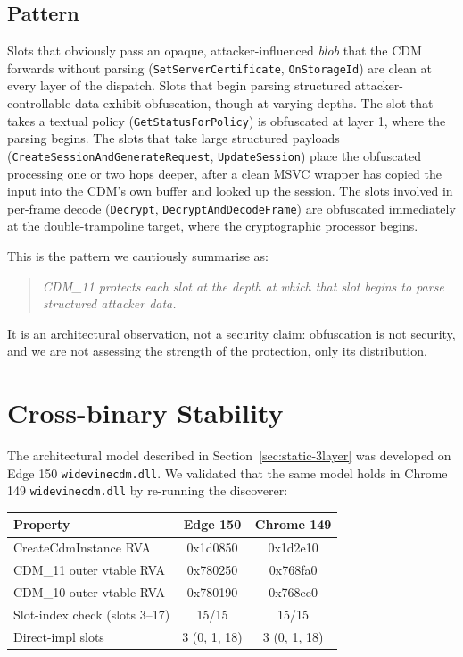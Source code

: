 \documentclass[11pt,letterpaper]{article}
\begin{document}
\subsection{Pattern}

Slots that obviously pass an opaque, attacker-influenced \emph{blob}
that the CDM forwards without parsing
(\texttt{SetServerCertificate}, \texttt{OnStorageId}) are clean at
every layer of the dispatch.  Slots that begin parsing structured
attacker-controllable data exhibit obfuscation, though at varying
depths.  The slot that takes a textual policy
(\texttt{GetStatusForPolicy}) is obfuscated at layer 1, where the
parsing begins.  The slots that take large structured payloads
(\texttt{CreateSessionAndGenerateRequest},
\texttt{UpdateSession}) place the obfuscated processing one or two
hops deeper, after a clean MSVC wrapper has copied the input into
the CDM's own buffer and looked up the session.  The slots involved
in per-frame decode (\texttt{Decrypt},
\texttt{DecryptAndDecodeFrame}) are obfuscated immediately at the
double-trampoline target, where the cryptographic processor begins.

This is the pattern we cautiously summarise as:

\begin{quote}\itshape
CDM\_11 protects each slot at the depth at which that slot begins
to parse structured attacker data.
\end{quote}

\noindent It is an architectural observation, not a security claim:
obfuscation is not security, and we are not assessing the strength
of the protection, only its distribution.

\section{Cross-binary Stability}
\label{sec:cross}

The architectural model described in
Section~\ref{sec:static-3layer} was developed on Edge 150
\texttt{widevinecdm.dll}.  We validated that the same model holds in
Chrome 149 \texttt{widevinecdm.dll} by re-running the discoverer:

\begin{center}\small
\begin{tabular}{lcc}
\toprule
\textbf{Property} & \textbf{Edge 150} & \textbf{Chrome 149} \\
\midrule
CreateCdmInstance RVA       & 0x1d0850 & 0x1d2e10 \\
CDM\_11 outer vtable RVA    & 0x780250 & 0x768fa0 \\
CDM\_10 outer vtable RVA    & 0x780190 & 0x768ee0 \\
Slot-index check (slots 3--17) & 15/15 & 15/15 \\
Direct-impl slots          & 3 (0, 1, 18) & 3 (0, 1, 18) \\
\bottomrule
\end{tabular}
\end{center}
\end{document}

